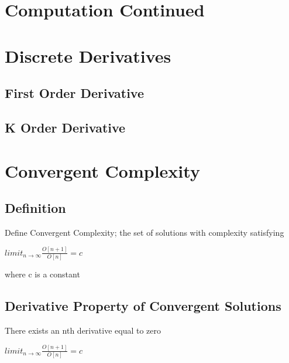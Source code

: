 \documentclass[11pt]{article}
\begin{document}
\section*{Computation Continued}




\section{Discrete Derivatives}
\subsection{First Order Derivative}
\subsection{K Order Derivative}






\section{Convergent Complexity}
\subsection{Definition}
Define Convergent Complexity; the set of solutions with complexity satisfying
\begin{center}
$
limit_{n \rightarrow \infty} \frac{O[n+1]}{O[n]} = c
$
\end{center}
where c is a constant

\subsection{Derivative Property of Convergent Solutions}
There exists an nth derivative equal to zero
\begin{center}
$
limit_{n \rightarrow \infty} \frac{O[n+1]}{O[n]} = c
$
\end{center}
\end{document}
